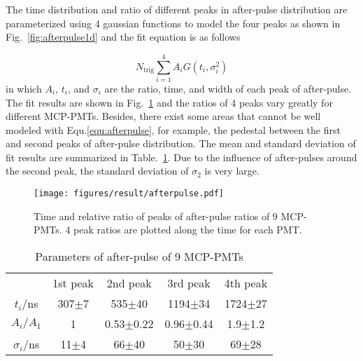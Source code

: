 The time distribution and ratio of different peaks in after-pulse distribution are parameterized using 4 gaussian functions to model the four peaks as shown in Fig.~\ref{fig:afterpulse1d} and the fit equation is as follows

\begin{equation}
    \label{equ:afterpulse}
    N_{\mathrm{trig}}\sum_{i=1}^{4}{A_iG(t_i,\sigma_i^2)}
\end{equation}
in which $A_i$, $t_i$, and $\sigma_i$ are the ratio, time, and width of each peak of after-pulse. The fit results are shown in Fig.~\ref{fig:afterpulsePeak} and the ratios of 4 peaks vary greatly for different MCP-PMTs. Besides, there exist some areas that cannot be well modeled with Equ.\eqref{equ:afterpulse}, for example, the pedestal between the first and second peaks of after-pulse distribution. The mean and standard deviation of fit results are summarized in Table.~\ref{tab:afterpulse}. Due to the influence of after-pulses around the second peak, the standard deviation of $\sigma_2$ is very large.
\begin{figure}[!htbp]
    \centering
    \texttt{[image: figures/result/afterpulse.pdf]}
    \caption{Time and relative ratio of peaks of after-pulse ratios of 9 MCP-PMTs. 4 peak ratios are plotted along the time for each PMT.}
    \label{fig:afterpulsePeak}
\end{figure}
\begin{table}
    \centering
    \caption{Parameters of after-pulse of 9 MCP-PMTs}
    \label{tab:afterpulse}
    \begin{tabular}{c|c|c|c|c}
        \hline
        &1st peak&2nd peak&3rd peak&4th peak\\
        $t_i$/ns&307$\pm$7&535$\pm$40&1194$\pm$34&1724$\pm$27\\
        $A_i/A_1$&1&0.53$\pm$0.22&0.96$\pm$0.44&1.9$\pm$1.2\\
        $\sigma_i$/ns&11$\pm$4&66$\pm$40&50$\pm$30&69$\pm$28\\
        \hline
    \end{tabular}
\end{table}

